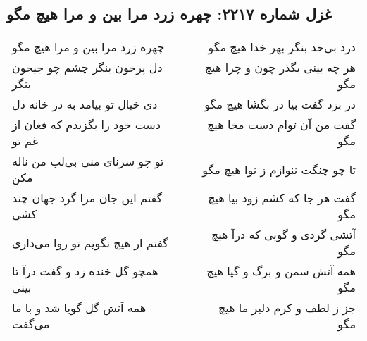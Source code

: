 \begin{center}
\section*{غزل شماره ۲۲۱۷: چهره زرد مرا بین و مرا هیچ مگو}
\label{sec:2217}
\begin{longtable}{l p{0.5cm} r}
چهره زرد مرا بین و مرا هیچ مگو
&&
درد بی‌حد بنگر بهر خدا هیچ مگو
\\
دل پرخون بنگر چشم چو جیحون بنگر
&&
هر چه بینی بگذر چون و چرا هیچ مگو
\\
دی خیال تو بیامد به در خانه دل
&&
در بزد گفت بیا در بگشا هیچ مگو
\\
دست خود را بگزیدم که فغان از غم تو
&&
گفت من آن توام دست مخا هیچ مگو
\\
تو چو سرنای منی بی‌لب من ناله مکن
&&
تا چو چنگت ننوازم ز نوا هیچ مگو
\\
گفتم این جان مرا گرد جهان چند کشی
&&
گفت هر جا که کشم زود بیا هیچ مگو
\\
گفتم ار هیچ نگویم تو روا می‌داری
&&
آتشی گردی و گویی که درآ هیچ مگو
\\
همچو گل خنده زد و گفت درآ تا بینی
&&
همه آتش سمن و برگ و گیا هیچ مگو
\\
همه آتش گل گویا شد و با ما می‌گفت
&&
جز ز لطف و کرم دلبر ما هیچ مگو
\\
\end{longtable}
\end{center}
